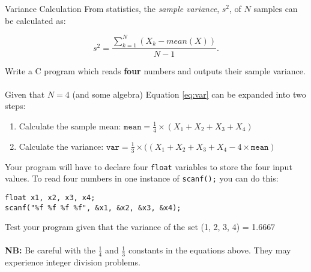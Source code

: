 \documentclass{lab}
\begin{document}
\begin{task}{Variance Calculation}{}
From statistics, the \textit{sample variance}, $s^2$, of $N$ samples can be calculated as:

\begin{equation}\label{eq:var}
s^2 = \frac{\sum_{k=1}^{N}(X_k - mean(X))}{N-1}.
\end{equation}

Write a C program which reads \textbf{four} numbers and outputs their sample variance.
\\ \\
Given that $N = 4$ (and some algebra) Equation \ref{eq:var} can be expanded into two steps:

\begin{enumerate}
\item Calculate the sample mean: $\texttt{mean} = \frac{1}{4} \times \left( X_1 + X_2 + X_3 + X_4 \right)$
\item Calculate the variance: $\texttt{var} = \frac{1}{3} \times ((X_1 + X_2 + X_3 + X_4 - 4 \times \texttt{mean})$
\end{enumerate}

Your program will have to declare four \texttt{float} variables to store the four input values. To read four numbers in one instance of \texttt{scanf();} you can do this:

\begin{lstlisting}[style=CStyle]
float x1, x2, x3, x4;
scanf("%f %f %f %f", &x1, &x2, &x3, &x4);
\end{lstlisting}

Test your program given that the variance of the set (1, 2, 3, 4) = 1.6667
\\ \\
\textbf{NB:} Be careful with the $\frac{1}{4}$ and $\frac{1}{3}$ constants in the equations above. They may experience integer division problems.
\end{task}
\end{document}
